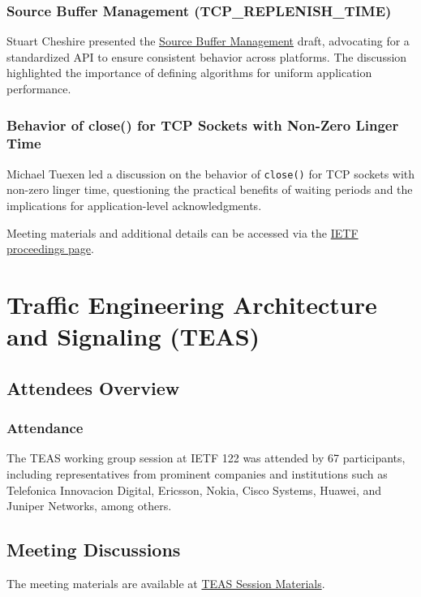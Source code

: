 \documentclass{article}
\begin{document}
\subsubsection{Source Buffer Management (TCP\_REPLENISH\_TIME)}
Stuart Cheshire presented the \href{https://datatracker.ietf.org/doc/html/draft-cheshire-sbm-01}{Source Buffer Management} draft, advocating for a standardized API to ensure consistent behavior across platforms. The discussion highlighted the importance of defining algorithms for uniform application performance.

\subsubsection{Behavior of close() for TCP Sockets with Non-Zero Linger Time}
Michael Tuexen led a discussion on the behavior of \texttt{close()} for TCP sockets with non-zero linger time, questioning the practical benefits of waiting periods and the implications for application-level acknowledgments.

Meeting materials and additional details can be accessed via the \href{https://www.ietf.org/proceedings/122/tcpm.html}{IETF proceedings page}.




\newpage

\section{Traffic Engineering Architecture and Signaling (TEAS)}

\subsection{Attendees Overview}
\subsubsection{Attendance}
The TEAS working group session at IETF 122 was attended by 67 participants, including representatives from prominent companies and institutions such as Telefonica Innovacion Digital, Ericsson, Nokia, Cisco Systems, Huawei, and Juniper Networks, among others.

\subsection{Meeting Discussions}
The meeting materials are available at \href{https://datatracker.ietf.org/meeting/122/session/teas}{TEAS Session Materials}.
\end{document}

